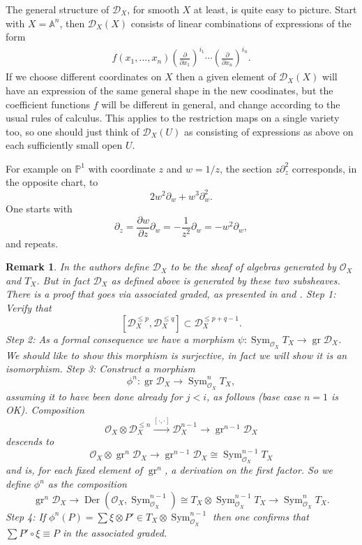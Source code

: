 \documentclass[12pt]{article}
\theoremstyle{plain}
\newtheorem{rem}[thm]{Remark}
\theoremstyle{definition}
\numberwithin{equation}{section}
\DeclareMathOperator{\Der}{Der}
\DeclareMathOperator{\Sym}{Sym}
\DeclareMathOperator{\gr}{gr}
\newcommand{\bbA}{\mathbb{A}}
\newcommand{\bbP}{\mathbb{P}}
\newcommand{\CD}{\mathcal{D}}
\newcommand{\OO}{\mathcal{O}}
\begin{document}
The general structure of $\CD_X$, for smooth $X$ at least, is quite easy to picture. Start with $X = \bbA^n$, then $\CD_X(X)$ consists of linear combinations of expressions of the form
\begin{align}\label{eq:diff.op.general}
f(x_1, \ldots, x_n) \left(\frac{\partial}{\partial x_1}\right)^{i_1} \cdots \left(\frac{\partial}{\partial x_n}\right)^{i_n}.
\end{align}
If we choose different coordinates on $X$ then a given element of $\CD_X(X)$ will have an expression of the same general shape in the new coodinates, but the coefficient functions $f$ will be different in general, and change according to the usual rules of calculus. This applies to the restriction maps on a single variety too, so one should just think of $\CD_X(U)$ as consisting of expressions as above on each sufficiently small open $U$.

For example on $\bbP^1$ with coordinate $z$ and $w = 1/z$, the section $z \partial_z^2$ corresponds, in the opposite chart, to
\[
2w^2 \partial_w + w^3 \partial_w^2.
\]
One starts with
\[
\partial_z = \frac{\partial w}{\partial z} \partial_w = -\frac{1}{z^2} \partial_w = -w^2 \partial_w,
\]
and repeats.



\begin{rem}
In \cite{HTT} the authors define $\CD_X$ to be the sheaf of algebras generated by $\OO_X$ and $T_X$. But in fact $\CD_X$ as defined above is generated by these two subsheaves. There is a proof that goes via associated graded, as presented in \cite{Gaitsgory-05} and \cite{yi.sun}. Step 1: Verify that
\[
[\CD_X^{\leq p}, \CD_X^{\leq q}] \subset \CD_X^{\leq p+q-1}.
\]
Step 2: As a formal consequence we have a morphism $\psi : \Sym_{\OO_X} T_X \rightarrow \gr \CD_X$. We should like to show this morphism is surjective, in fact we will show it is an isomorphism. Step 3: Construct a morphism
\[
\phi^n : \gr \CD_X \rightarrow \Sym^n_{\OO_X} T_X,
\]
assuming it to have been done already for $j < i$, as follows (base case $n = 1$ is OK). Composition
\[
\OO_X \otimes \CD^{\leq n}_X \xrightarrow{\text{$[\cdot,\cdot]$}} \CD^{n-1}_X \rightarrow \gr^{n-1} \CD_X
\]
descends to
\[
\OO_X \otimes \gr^{n} \CD_X \rightarrow \gr^{n-1} \CD_X \cong \Sym^{n-1}_{\OO_X} T_X
\]
and is, for each fixed element of $\gr^n$, a derivation on the first factor. So we define $\phi^n$ as the composition
\[
\gr^{n} \CD_X \rightarrow \Der(\OO_X, \Sym^{n-1}_{\OO_X}) \cong T_X \otimes \Sym^{n-1}_{\OO_X} T_X \rightarrow \Sym^{n}_{\OO_X} T_X.
\]
Step 4: If $\phi^n(P) = \sum \xi \otimes P' \in T_X \otimes \Sym^{n-1}_{\OO_X}$ then one confirms that $\sum P' \circ \xi \equiv P$ in the associated graded.

\end{rem}
\end{document}
